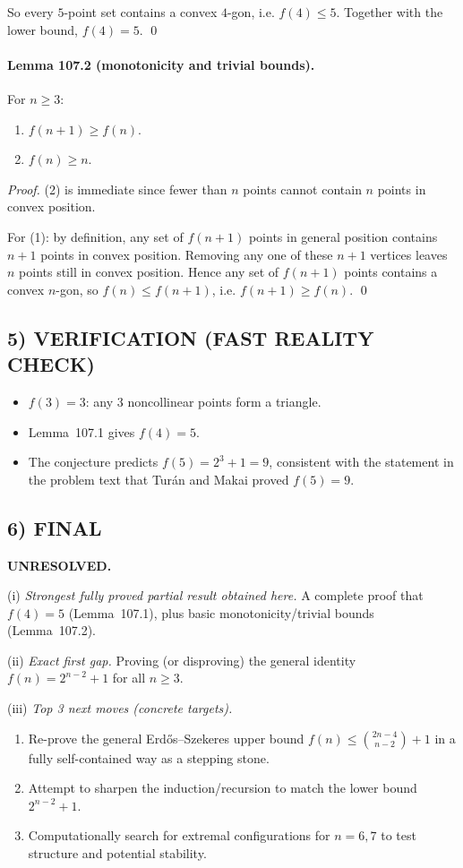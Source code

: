 So every $5$-point set contains a convex $4$-gon, i.e. $f(4)\le5$.  Together with the lower bound, $f(4)=5$. \qed

\paragraph{Lemma 107.2 (monotonicity and trivial bounds).}
For $n\ge3$:
\begin{enumerate}
\item $f(n+1)\ge f(n)$.
\item $f(n)\ge n$.
\end{enumerate}

\emph{Proof.}
(2) is immediate since fewer than $n$ points cannot contain $n$ points in convex position.

For (1): by definition, any set of $f(n+1)$ points in general position contains $n+1$ points in convex position.  Removing any one of these $n+1$ vertices leaves $n$ points still in convex position.  Hence any set of $f(n+1)$ points contains a convex $n$-gon, so $f(n)\le f(n+1)$, i.e. $f(n+1)\ge f(n)$. \qed

\subsection*{5) VERIFICATION (FAST REALITY CHECK)}
\begin{itemize}
\item $f(3)=3$: any $3$ noncollinear points form a triangle.
\item Lemma~107.1 gives $f(4)=5$.
\item The conjecture predicts $f(5)=2^{3}+1=9$, consistent with the statement in the problem text that Tur\'an and Makai proved $f(5)=9$.
\end{itemize}

\subsection*{6) FINAL}
\textbf{UNRESOLVED.}

(i) \emph{Strongest fully proved partial result obtained here.}
A complete proof that $f(4)=5$ (Lemma~107.1), plus basic monotonicity/trivial bounds (Lemma~107.2).

(ii) \emph{Exact first gap.}
Proving (or disproving) the general identity $f(n)=2^{n-2}+1$ for all $n\ge3$.

(iii) \emph{Top 3 next moves (concrete targets).}
\begin{enumerate}
\item Re-prove the general Erd\H{o}s--Szekeres upper bound $f(n)\le \binom{2n-4}{n-2}+1$ in a fully self-contained way as a stepping stone.
\item Attempt to sharpen the induction/recursion to match the lower bound $2^{n-2}+1$.
\item Computationally search for extremal configurations for $n=6,7$ to test structure and potential stability.
\end{enumerate}

